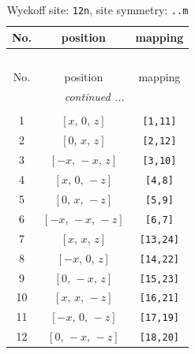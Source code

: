 \documentclass[fleqn,8pt]{jsarticle}
\begin{document}
\begin{longtable}{ccc}
\caption{Wyckoff site: {\tt 12n}, site symmetry: {\tt ..m}}
 \\
 \hline \hline
No. & position & mapping \\ \hline \endfirsthead

\multicolumn{2}{l}{\tablename\ \thetable{}} \\
 \hline \hline
No. & position & mapping \\ \hline \endhead

 \hline \hline
\multicolumn{2}{r}{\footnotesize\it continued ...} \\ \endfoot

 \hline \hline
\multicolumn{2}{r}{} \\ \endlastfoot

1 & $\left[ x,\, 0,\, z \right]$ & {\tt [1,11]} \\ \hline
2 & $\left[ 0,\, x,\, z \right]$ & {\tt [2,12]} \\ \hline
3 & $\left[ - x,\, - x,\, z \right]$ & {\tt [3,10]} \\ \hline
4 & $\left[ x,\, 0,\, - z \right]$ & {\tt [4,8]} \\ \hline
5 & $\left[ 0,\, x,\, - z \right]$ & {\tt [5,9]} \\ \hline
6 & $\left[ - x,\, - x,\, - z \right]$ & {\tt [6,7]} \\ \hline
7 & $\left[ x,\, x,\, z \right]$ & {\tt [13,24]} \\ \hline
8 & $\left[ - x,\, 0,\, z \right]$ & {\tt [14,22]} \\ \hline
9 & $\left[ 0,\, - x,\, z \right]$ & {\tt [15,23]} \\ \hline
10 & $\left[ x,\, x,\, - z \right]$ & {\tt [16,21]} \\ \hline
11 & $\left[ - x,\, 0,\, - z \right]$ & {\tt [17,19]} \\ \hline
12 & $\left[ 0,\, - x,\, - z \right]$ & {\tt [18,20]} \\
\end{longtable}
\renewcommand{\arraystretch}{1.2}
\end{document}
